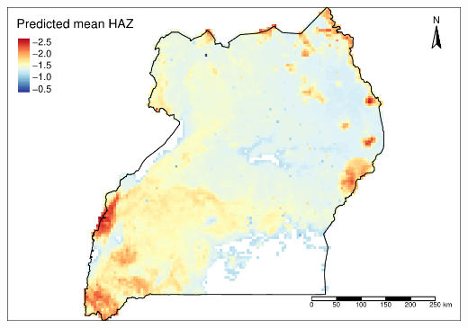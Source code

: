 \documentclass[11pt,]{article}
\begin{document}
\includegraphics{skeleton_files/figure-latex/maps-1.pdf}
\end{document}
